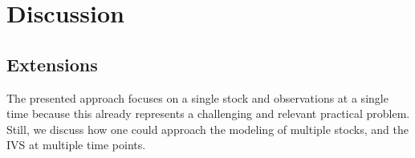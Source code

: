 %
%
%
%
%
% 





\section{Discussion}\label{sec:discussion}

\subsection{Extensions}

The presented approach focuses on a single stock and observations at a single time because this already represents a challenging and relevant practical problem.
Still, we discuss how one could approach the modeling of multiple stocks, and the IVS at multiple time points.

